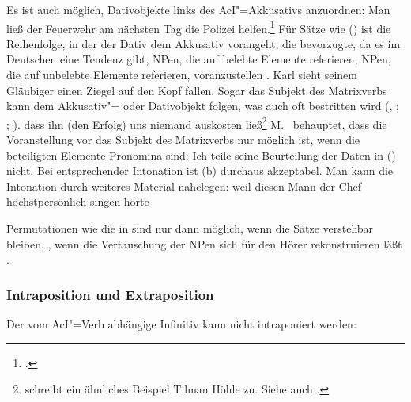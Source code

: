\noindent
Es ist auch möglich, Dativobjekte links des AcI"=Akkusativs anzuordnen:
\ea Man ließ der Feuerwehr           am     nächsten Tag die Polizei      helfen.\footnote{
        .
      }
\z
Für Sätze wie () ist die Reihenfolge, in der der Dativ dem Akkusativ vorangeht,
die bevorzugte, da es im Deutschen eine Tendenz gibt, NPen, die auf belebte Elemente referieren,
NPen, die auf unbelebte Elemente referieren, voranzustellen \citep*[]{Hoberg81a}.
\ea
Karl sieht seinem Gläubiger einen Ziegel auf den Kopf fallen.\label{fallen-sehen}
\z
%
Sogar das Subjekt des Matrixverbs kann dem Akkusativ"= oder Dativobjekt folgen,
was auch oft bestritten wird (\citealp[]{Grewendorf87a},
\citealp*[]{Grewendorf88a}; \citealp[]{Wurmbrand98a};
\citealp[, 306]{Cook2001a}).
\ea
dass  ihn      (den Erfolg) uns      niemand      auskosten ließ\footnote{
        \citet*[]{Haider91} schreibt ein ähnliches Beispiel
        Tilman Höhle zu. Siehe auch .
}
\z
M.\ \citet[]{MRichter2002b} behauptet, dass die Voranstellung vor das Subjekt des Matrixverbs
nur möglich ist, wenn die beteiligten Elemente Pronomina sind:
\eal
{}
\zl
Ich teile seine Beurteilung der Daten in () nicht. Bei entsprechender Intonation
ist (b) durchaus akzeptabel. Man kann die Intonation durch weiteres Material nahelegen:
\ea
weil diesen Mann der Chef höchstpersönlich singen hörte
\z

\noindent
Permutationen wie die in  sind nur dann
möglich, wenn die Sätze verstehbar bleiben, \dash, wenn die Vertauschung der NPen sich für den Hörer
rekonstruieren läßt \citep[]{Mueller99a}. 


\subsubsection{Intraposition und Extraposition}
\label{sec-aci-ie}

Der vom AcI"=Verb abhängige Infinitiv kann nicht intraponiert werden:
\eal
{}
\zl

